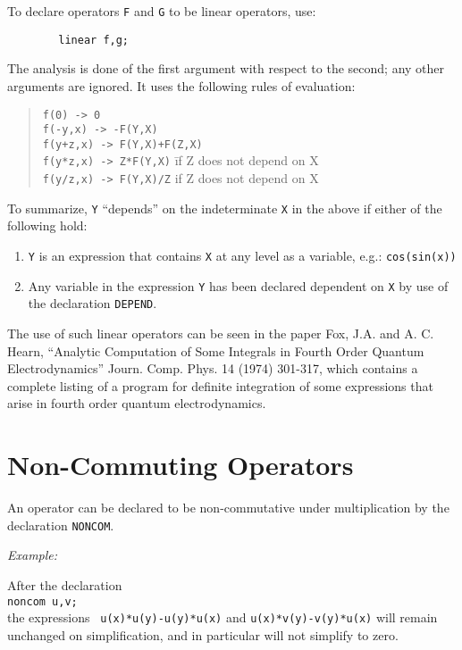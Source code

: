 To declare operators {\tt F} and {\tt G} to be linear operators,
use:
\begin{verbatim}
        linear f,g;
\end{verbatim}
The analysis is done of the first argument with respect to the second; any
other arguments are ignored. It uses the following rules of evaluation:
\begin{quote}
\begin{tabbing}
{\tt    f(0)      ->   0} \\
{\tt    f(-y,x)   ->  -F(Y,X)} \\
{\tt    f(y+z,x)  ->   F(Y,X)+F(Z,X)} \\
{\tt    f(y*z,x)  ->   Z*F(Y,X)} \hspace{0.5in}\= if Z does not depend on X \\
{\tt    f(y/z,x)  ->   F(Y,X)/Z} \> if Z does not depend on X
\end{tabbing}
\end{quote}
To summarize, {\tt Y} ``depends'' on the indeterminate {\tt X} in the above
if either of the following hold:
\begin{enumerate}
\item {\tt Y} is an expression that contains {\tt X} at any level as a
      variable, e.g.: {\tt cos(sin(x))}

\item Any variable in the expression {\tt Y} has been declared dependent on
      {\tt X} by use of the declaration {\tt DEPEND}.
\end{enumerate}
The use of such linear operators can be seen in the
paper Fox, J.A. and A. C. Hearn, ``Analytic Computation of Some Integrals
in Fourth Order Quantum Electrodynamics'' Journ. Comp. Phys. 14 (1974)
301-317, which contains a complete listing of a program for definite
integration of some expressions that arise in fourth
order quantum electrodynamics.

\section{Non-Commuting Operators}
An operator can be declared to be non-commutative under multiplication by
the declaration {\tt NONCOM}.

{\it Example:}

After the declaration \\
{\tt noncom u,v;}\\
the expressions {\tt
u(x)*u(y)-u(y)*u(x)} and {\tt u(x)*v(y)-v(y)*u(x)} will remain unchanged
on simplification, and in particular will not simplify to zero.

